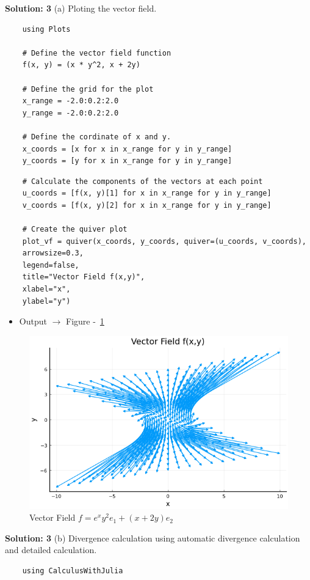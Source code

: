 \documentclass{homework}
\begin{document}
\begin{solution}
    \textbf{Solution: 3}
    (a)  Ploting the vector field.
    \begin{verbatim}
    using Plots

    # Define the vector field function
    f(x, y) = (x * y^2, x + 2y)
    
    # Define the grid for the plot
    x_range = -2.0:0.2:2.0
    y_range = -2.0:0.2:2.0

    # Define the cordinate of x and y.
    x_coords = [x for x in x_range for y in y_range]
    y_coords = [y for x in x_range for y in y_range]
    \end{verbatim}
    \begin{verbatim}    
    # Calculate the components of the vectors at each point
    u_coords = [f(x, y)[1] for x in x_range for y in y_range]
    v_coords = [f(x, y)[2] for x in x_range for y in y_range]

    # Create the quiver plot
    plot_vf = quiver(x_coords, y_coords, quiver=(u_coords, v_coords), 
    arrowsize=0.3, 
    legend=false, 
    title="Vector Field f(x,y)",
    xlabel="x",
    ylabel="y")
    \end{verbatim}
    
    \begin{itemize}
        \item Output $\rightarrow$ Figure -~\ref{fig:vectorfield-2}
    \end{itemize}
    
    \begin{figure}[H]
        \centering
        \includegraphics[width=0.5\linewidth]{media/vectorfield-2.png}
        \caption{Vector Field $f = e^xy^2e_1 + (x + 2y)e_2 $}
        \label{fig:vectorfield-2}
    \end{figure}
    
    \textbf{Solution: 3}
    (b)  Divergence calculation using automatic divergence calculation and detailed calculation.
    \begin{verbatim}
    using CalculusWithJulia


\end{verbatim}
\end{solution}
\end{document}
